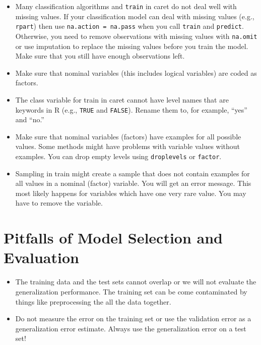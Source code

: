 \documentclass[
  notitlepage]{book}
\providecommand{\tightlist}{%
  \setlength{\itemsep}{0pt}\setlength{\parskip}{0pt}}
\begin{document}
\begin{itemize}
\tightlist
\item
  Many classification algorithms and \texttt{train} in caret do not deal well
  with missing values. If your classification model can deal with
  missing values (e.g., \texttt{rpart}) then use \texttt{na.action\ =\ na.pass} when
  you call \texttt{train} and \texttt{predict}. Otherwise, you need to remove
  observations with missing values with \texttt{na.omit} or use imputation to
  replace the missing values before you train the model. Make sure
  that you still have enough observations left.
\item
  Make sure that nominal variables (this includes logical variables)
  are coded as factors.
\item
  The class variable for train in caret cannot have level names that
  are keywords in R (e.g., \texttt{TRUE} and \texttt{FALSE}). Rename them to, for
  example, ``yes'' and ``no.''
\item
  Make sure that nominal variables (factors) have examples for all
  possible values. Some methods might have problems with variable
  values without examples. You can drop empty levels using
  \texttt{droplevels} or \texttt{factor}.
\item
  Sampling in train might create a sample that does not contain
  examples for all values in a nominal (factor) variable. You will get
  an error message. This most likely happens for variables which have
  one very rare value. You may have to remove the variable.
\end{itemize}

\hypertarget{pitfalls-of-model-selection-and-evaluation}{%
\section{Pitfalls of Model Selection and Evaluation}\label{pitfalls-of-model-selection-and-evaluation}}

\begin{itemize}
\tightlist
\item
  The training data and the test sets cannot overlap or we will not
  evaluate the generalization performance. The training set can be come
  contaminated by things like preprocessing the all the data together.
\item
  Do not measure the error on the training set or
  use the validation error as a generalization error estimate.
  Always use the generalization error on a test set!
\end{itemize}
\end{document}
